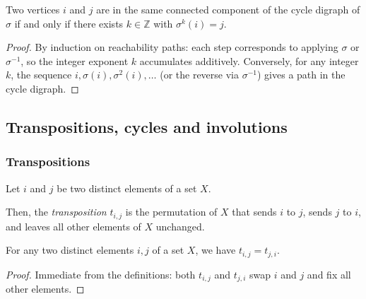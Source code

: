 \begin{lemma}
\label{lem.perm.cycleDigraph.reachable}
\leanhelper
\leanok
Two vertices $i$ and $j$ are in the same connected component of the cycle
digraph of $\sigma$ if and only if there exists $k \in \mathbb{Z}$ with
$\sigma^k(i) = j$.
\end{lemma}

\begin{proof}
\leanok
By induction on reachability paths: each step corresponds to applying
$\sigma$ or $\sigma^{-1}$, so the integer exponent $k$ accumulates
additively.  Conversely, for any integer $k$, the sequence
$i, \sigma(i), \sigma^2(i), \ldots$ (or the reverse via $\sigma^{-1}$)
gives a path in the cycle digraph.
\end{proof}

\subsection{Transpositions, cycles and involutions}

\subsubsection{Transpositions}

\begin{definition}
\label{def.perm.tij}
\leantarget
\leanok
Let $i$ and $j$ be two distinct elements of a set $X$.

Then, the \emph{transposition} $t_{i,j}$ is the permutation of $X$ that sends
$i$ to $j$, sends $j$ to $i$, and leaves all other elements of $X$ unchanged.
\end{definition}

\begin{lemma}
\label{lem.perm.tij.symm}
\leanhelper
\leanok
For any two distinct elements $i, j$ of a set $X$, we have $t_{i,j} = t_{j,i}$.
\end{lemma}

\begin{proof}
\leanok
Immediate from the definitions: both $t_{i,j}$ and $t_{j,i}$ swap $i$ and $j$ and fix all other elements.
\end{proof}

